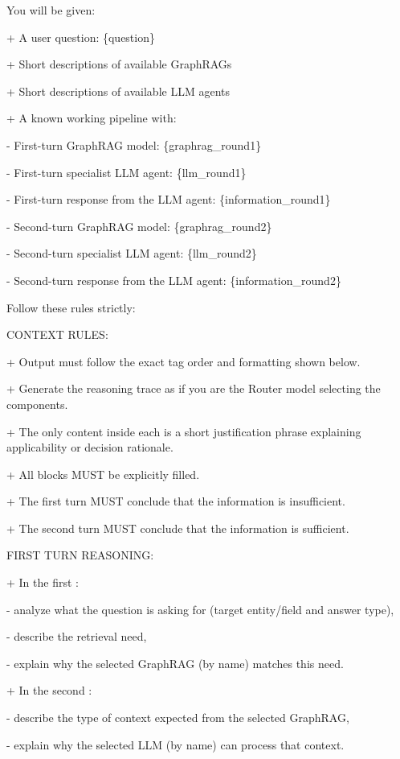 \begin{tcolorbox}
\medskip
You will be given: \par\noindent
+ A user question: \{question\} \par\noindent
+ Short descriptions of available GraphRAGs \par\noindent
+ Short descriptions of available LLM agents \par\noindent 
+ A known working pipeline with: \par\noindent
\quad - First-turn GraphRAG model: \{graphrag\_round1\} \par\noindent
\quad - First-turn specialist LLM agent: \{llm\_round1\} \par\noindent
\quad - First-turn response from the LLM agent: \{information\_round1\} \par\noindent
\quad - Second-turn GraphRAG model: \{graphrag\_round2\} \par\noindent
\quad - Second-turn specialist LLM agent: \{llm\_round2\} \par\noindent 
\quad - Second-turn response from the LLM agent: \{information\_round2\} \par\noindent

\medskip
Follow these rules strictly:

\medskip
CONTEXT RULES: \par\noindent
+ Output must follow the exact tag order and formatting shown below. \par\noindent
+ Generate the reasoning trace as if you are the Router model selecting the components. \par\noindent
+ The only content inside each  is a short justification phrase
  explaining applicability or decision rationale. \par\noindent
+ All  blocks MUST be explicitly filled. \par\noindent
+ The first turn MUST conclude that the information is insufficient. \par\noindent
+ The second turn MUST conclude that the information is sufficient. \par\noindent

\medskip
FIRST TURN REASONING: \par\noindent
+ In the first : \par\noindent
\quad - analyze what the question is asking for (target entity/field and answer type), \par\noindent
\quad - describe the retrieval need, \par\noindent
\quad - explain why the selected GraphRAG (by name) matches this need. \par\noindent
+ In the second : \par\noindent
\quad - describe the type of context expected from the selected GraphRAG, \par\noindent
\quad - explain why the selected LLM (by name) can process that context. \par\noindent


\end{tcolorbox}




